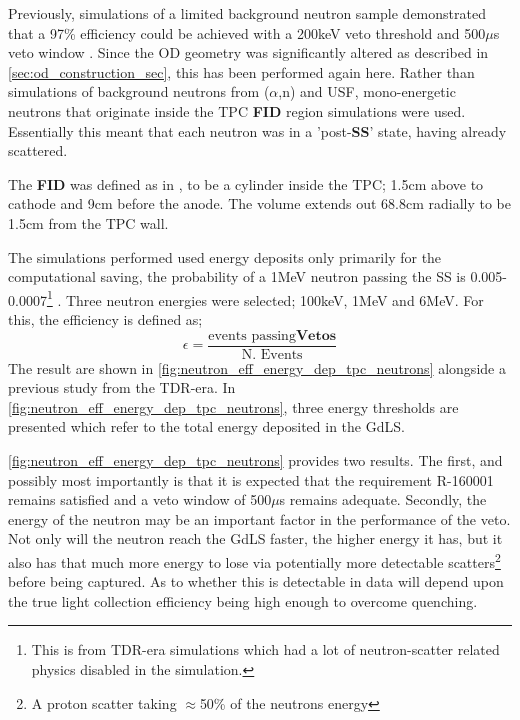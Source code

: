 \par
Previously, simulations of a limited background neutron sample demonstrated that a 97\% efficiency could be achieved with a 200keV veto threshold and 500$\mu$s veto window \cite{LZ_TechnicalDesignReview_ref}.
Since the OD geometry was significantly altered as described in \autoref{sec:od_construction_sec}, this has been performed again here.
Rather than simulations of background neutrons from ($\alpha$,n) and USF, mono-energetic neutrons that originate inside the TPC \textbf{FID} region simulations were used.
Essentially this meant that each neutron was in a 'post-\textbf{SS}' state, having already scattered.

\par
The \textbf{FID} was defined as in \cite{LZ_TechnicalDesignReview_ref}, to be a cylinder inside the TPC; 1.5cm above to cathode and 9cm before the anode.
The volume extends out 68.8cm radially to be 1.5cm from the TPC wall.

\par
The simulations performed used energy deposits only primarily for the computational saving, the probability of a 1MeV neutron passing the SS is 0.005-0.0007\footnote{This is from TDR-era simulations which had a lot of neutron-scatter related physics disabled in the simulation.} \cite{sallyshaw_thesis_ref}.
Three neutron energies were selected; 100keV, 1MeV and 6MeV.
For this, the efficiency is defined as;
\begin{equation}
    \epsilon = \frac{\text{events passing}\mathbf{Vetos}}{\text{N. Events}}
    \label{eq:reduced_neutron_efficiency}
\end{equation}
The result are shown in \autoref{fig:neutron_eff_energy_dep_tpc_neutrons} alongside a previous study from the TDR-era.
In \autoref{fig:neutron_eff_energy_dep_tpc_neutrons}, three energy thresholds are presented which refer to the total energy deposited in the GdLS.



\par
\autoref{fig:neutron_eff_energy_dep_tpc_neutrons} provides two results.
The first, and possibly most importantly is that it is expected that the requirement R-160001 remains satisfied and a veto window of 500$\mu$s remains adequate.
Secondly, the energy of the neutron may be an important factor in the performance of the veto.
Not only will the neutron reach the GdLS faster, the higher energy it has, but it also has that much more energy to lose via potentially more detectable scatters\footnote{A proton scatter taking $\approx$50\% of the neutrons energy} before being captured.
As to whether this is detectable in data will depend upon the true light collection efficiency being high enough to overcome quenching.

